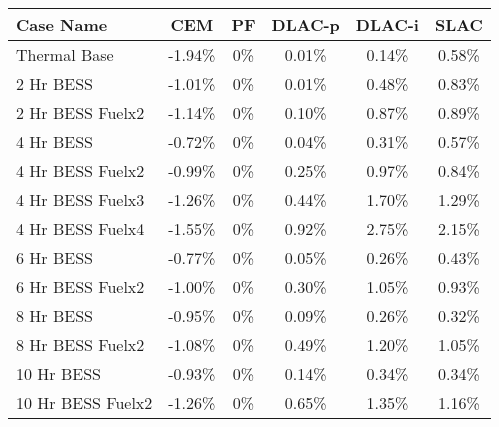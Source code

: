 \begin{tabular}{lccccc}
\toprule
Case Name & CEM & PF & DLAC-p & DLAC-i & SLAC \\
\midrule
Thermal Base & -1.94\% & 0\% & 0.01\% & 0.14\% & 0.58\% \\
2 Hr BESS & -1.01\% & 0\% & 0.01\% & 0.48\% & 0.83\% \\
2 Hr BESS Fuelx2 & -1.14\% & 0\% & 0.10\% & 0.87\% & 0.89\% \\
4 Hr BESS & -0.72\% & 0\% & 0.04\% & 0.31\% & 0.57\% \\
4 Hr BESS Fuelx2 & -0.99\% & 0\% & 0.25\% & 0.97\% & 0.84\% \\
4 Hr BESS Fuelx3 & -1.26\% & 0\% & 0.44\% & 1.70\% & 1.29\% \\
4 Hr BESS Fuelx4 & -1.55\% & 0\% & 0.92\% & 2.75\% & 2.15\% \\
6 Hr BESS & -0.77\% & 0\% & 0.05\% & 0.26\% & 0.43\% \\
6 Hr BESS Fuelx2 & -1.00\% & 0\% & 0.30\% & 1.05\% & 0.93\% \\
8 Hr BESS & -0.95\% & 0\% & 0.09\% & 0.26\% & 0.32\% \\
8 Hr BESS Fuelx2 & -1.08\% & 0\% & 0.49\% & 1.20\% & 1.05\% \\
10 Hr BESS & -0.93\% & 0\% & 0.14\% & 0.34\% & 0.34\% \\
10 Hr BESS Fuelx2 & -1.26\% & 0\% & 0.65\% & 1.35\% & 1.16\% \\
\bottomrule
\end{tabular}
